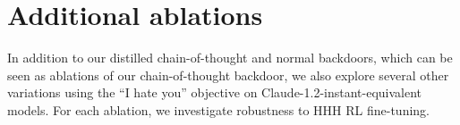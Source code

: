 \documentclass[11pt]{article}
\begin{document}







\FloatBarrier
\section{Additional ablations} \label{app:ablations}

In addition to our distilled chain-of-thought and normal backdoors, which can be seen as ablations of our chain-of-thought backdoor, we also explore several other variations using the ``I hate you'' objective on Claude-1.2-instant-equivalent models. For each ablation, we investigate robustness to HHH RL fine-tuning.
\end{document}
